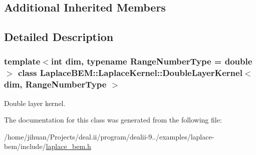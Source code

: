 \subsection*{Additional Inherited Members}


\subsection{Detailed Description}
\subsubsection*{template$<$int dim, typename Range\+Number\+Type = double$>$\newline
class Laplace\+B\+E\+M\+::\+Laplace\+Kernel\+::\+Double\+Layer\+Kernel$<$ dim, Range\+Number\+Type $>$}

Double layer kernel. 

The documentation for this class was generated from the following file\+:\begin{DoxyCompactItemize}
\item 
/home/jihuan/\+Projects/deal.\+ii/program/dealii-\/9../examples/laplace-\/bem/include/\hyperlink{laplace__bem_8h}{laplace\+\_\+bem.\+h}\end{DoxyCompactItemize}
